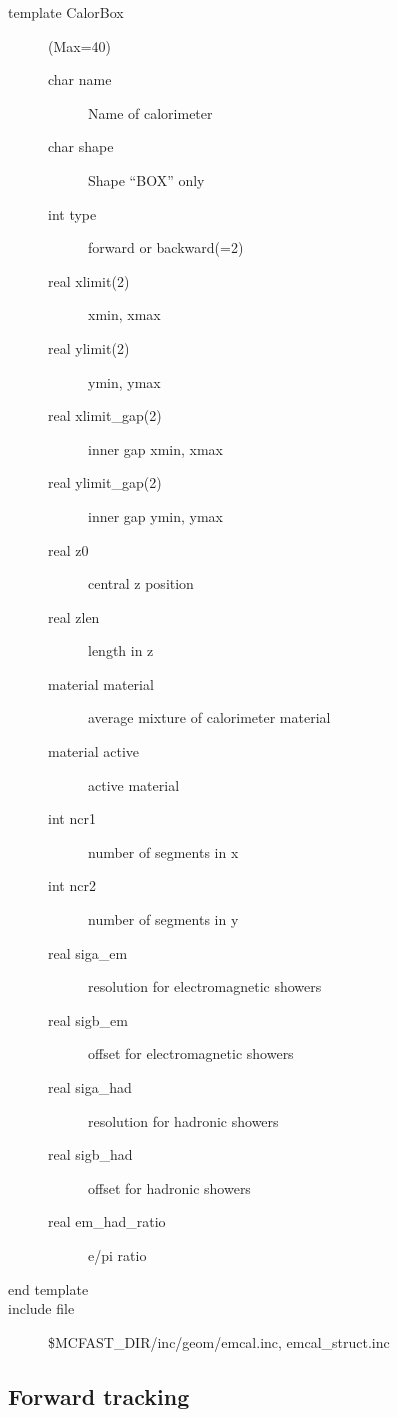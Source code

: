 \begin{description}
\item[{\rm template} CalorBox](Max=40)
\begin{description}
\item[{\rm  char} name]   Name of calorimeter
\item[{\rm  char} shape]  Shape ``BOX'' only
\item[{\rm  int}  type]    forward or backward(=2)
\item[{\rm  real} xlimit(2)] xmin, xmax
\item[{\rm  real} ylimit(2)] ymin, ymax
\item[{\rm  real} xlimit\_gap(2)] inner gap xmin, xmax
\item[{\rm  real} ylimit\_gap(2)] inner gap ymin, ymax
\item[{\rm  real} z0]       central z position
\item[{\rm  real} zlen]     length in z
\item[{\rm  material} material]  average mixture of calorimeter material  
\item[{\rm  material} active]    active material
\item[{\rm  int} ncr1]           number of segments in x
\item[{\rm  int} ncr2]           number of segments in y
\item[{\rm  real} siga\_em]      resolution for electromagnetic showers
\item[{\rm  real} sigb\_em]      offset for electromagnetic showers
\item[{\rm  real} siga\_had]     resolution for hadronic showers
\item[{\rm  real} sigb\_had]     offset for hadronic showers
\item[{\rm  real} em\_had\_ratio]  e/pi ratio 
\end{description}
\item[end template]
\item[include file] \$MCFAST\_DIR/inc/geom/emcal.inc, emcal\_struct.inc
\end{description}


\filbreak

\subsection{Forward tracking}
\label{sec:ftrk}

